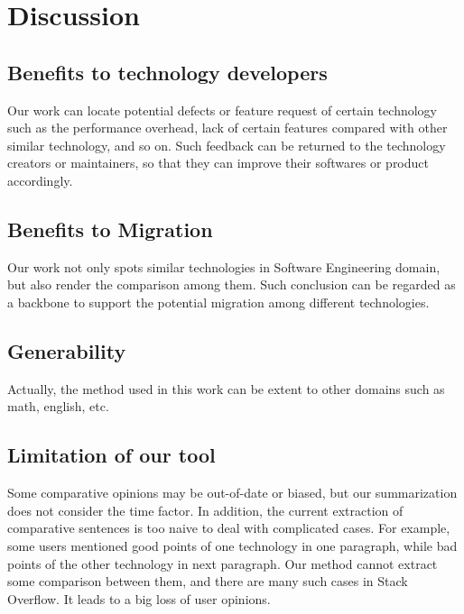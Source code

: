 \section{Discussion}
\subsection{Benefits to technology developers}
Our work can locate potential defects or feature request of certain technology such as the performance overhead, lack of certain features compared with other similar technology, and so on.
Such feedback can be returned to the technology creators or maintainers, so that they can improve their softwares or product accordingly.

\subsection{Benefits to Migration}
Our work not only spots similar technologies in Software Engineering domain, but also render the comparison among them.
Such conclusion can be regarded as a backbone to support the potential migration among different technologies.

\subsection{Generability}
Actually, the method used in this work can be extent to other domains such as math, english, etc.

\subsection{Limitation of our tool}
Some comparative opinions may be out-of-date or biased, but our summarization does not consider the time factor.
In addition, the current extraction of comparative sentences is too naive to deal with complicated cases.
For example, some users mentioned good points of one technology in one paragraph, while bad points of the other technology in next paragraph.
Our method cannot extract some comparison between them, and there are many such cases in Stack Overflow.
It leads to a big loss of user opinions.
